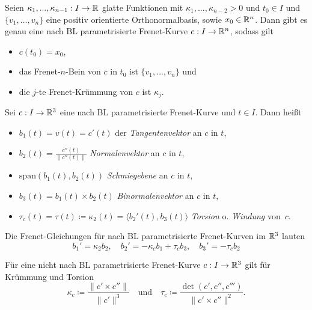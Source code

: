 \documentclass{cheat-sheet}
\newcommand{\Span}{\mathrm{span}}
\begin{document}

\begin{satz}
  Seien $\kappa_1, ..., \kappa_{n-1} : I \to \mathbb{R}$ glatte Funktionen mit $\kappa_1, ..., \kappa_{n-2} > 0$ und $t_0 \in I$ und $\{ v_1, ..., v_n \}$ eine positiv orientierte Orthonormalbasis, sowie $x_0 \in \mathbb{R}^n$. Dann gibt es genau eine nach BL parametrisierte Frenet-Kurve $c : I \to \mathbb{R}^n$, sodass gilt
  \begin{itemize}
    \item $c(t_0) = x_0$,
    \item das Frenet-$n$-Bein von $c$ in $t_0$ ist $\{ v_1, ..., v_n \}$ und
    \item die $j$-te Frenet-Krümmung von $c$ ist $\kappa_j$.
  \end{itemize}
\end{satz}

\begin{defn}
  Sei $c : I \to \mathbb{R}^3$ eine nach BL parametrisierte Frenet-Kurve und $t \in I$. Dann heißt
  \begin{itemize}
    \item $b_1(t) = v(t) = c'(t)$ der \emph{Tangentenvektor} an $c$ in $t$,
    \item $b_2(t) = \tfrac{c''(t)}{\| c''(t) \|}$ \emph{Normalenvektor} an $c$ in $t$,
    \item $\Span(b_1(t), b_2(t))$ \emph{Schmiegebene} an $c$ in $t$,
    \item $b_3(t) = b_1(t) \times b_2(t)$ \emph{Binormalenvektor} an $c$ in $t$,
    \item $\tau_c(t) = \tau(t) \coloneqq \kappa_2(t) = \langle b_2'(t) , b_3(t) \rangle$ \emph{Torsion} o. \emph{Windung} von~$c$.
  \end{itemize}
\end{defn}

\begin{bem}
  Die Frenet-Gleichungen für nach BL parametrisierte Frenet-Kurven im $\mathbb{R}^3$ lauten
  \[
      b_1' = \kappa_2 b_2, \quad
      b_2' = - \kappa_c b_1 + \tau_c b_3, \quad
      b_3' = - \tau_c b_2
  \]
\end{bem}


\begin{bem}
  Für eine nicht nach BL parametrisierte Frenet-Kurve $c : I \to \mathbb{R}^3$ gilt für Krümmung und Torsion
  \[ \kappa_c \coloneqq \frac{\| c' \times c'' \|}{\| c' \|^3} \quad \text{und} \quad \tau_c \coloneqq \frac{\det(c', c'', c''')}{\| c' \times c'' \|^2}. \]
\end{bem}
\end{document}
